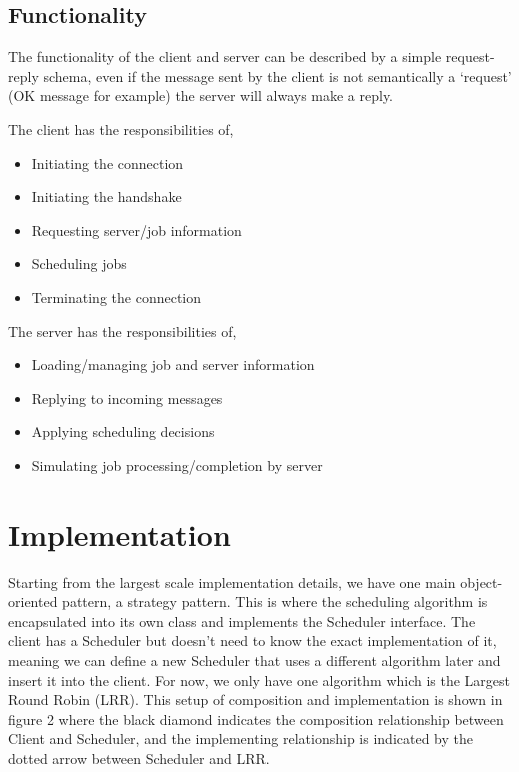 \documentclass[a4paper]{article} %
\begin{document}
\subsection{Functionality}
The functionality of the client and server can be described by a simple request-reply schema, even if the message sent by the client is not semantically a ‘request’ (OK message for example) the server will always make a reply.\par
The client has the responsibilities of,
\begin{itemize}
    \item Initiating the connection
    \item Initiating the handshake
    \item Requesting server/job information
    \item Scheduling jobs
    \item Terminating the connection
\end{itemize}

The server has the responsibilities of,
\begin{itemize}
    \item Loading/managing job and server information
    \item Replying to incoming messages
    \item Applying scheduling decisions
    \item Simulating job processing/completion by server 
\end{itemize}

\section{Implementation}
Starting from the largest scale implementation details, we have one main object-oriented pattern, a strategy pattern. This is where the scheduling algorithm is encapsulated into its own class and implements the Scheduler interface. The client has a Scheduler but doesn’t need to know the exact implementation of it, meaning we can define a new Scheduler that uses a different algorithm later and insert it into the client. For now, we only have one algorithm which is the Largest Round Robin (LRR). This setup of composition and implementation is shown in figure 2 where the black diamond indicates the composition relationship between Client and Scheduler, and the implementing relationship is indicated by the dotted arrow between Scheduler and LRR.
\end{document}
